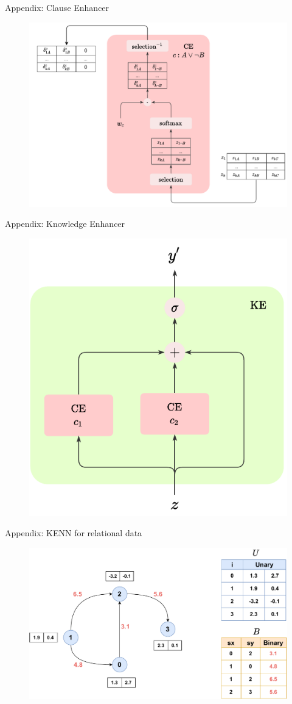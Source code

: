 \documentclass{beamer}
\begin{document}
\begin{frame}{Appendix: Clause Enhancer}
	\begin{figure}
		\includegraphics[width=0.9\linewidth]{images/CE_presentation.pdf}
	\end{figure}
\end{frame}

\begin{frame}{Appendix: Knowledge Enhancer}
	\begin{figure}
		\centering
		\includegraphics[width=0.55\linewidth]{images/KE.pdf}
	\end{figure}
\end{frame}

\begin{frame}{Appendix: KENN for relational data}
	\begin{figure}
		\includegraphics[width=0.9\linewidth]{images/kenn_relational_representation2.pdf}
	\end{figure}
\end{frame}
\end{document}
